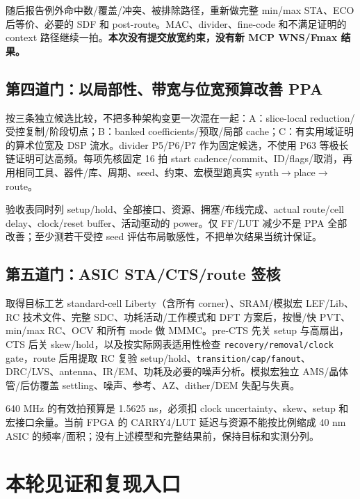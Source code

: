 \documentclass[UTF8,fontset=fandol,10pt,a4paper,openany]{ctexrep}
\newcommand{\code}[1]{\nolinkurl{#1}}
\begin{document}
随后报告例外命中数/覆盖/冲突、被排除路径，重新做完整 min/max STA、ECO 后等价、必要的 SDF 和 post-route。MAC、divider、fine-code 和不满足证明的 context 路径继续一拍。\textbf{本次没有提交放宽约束，没有新 MCP WNS/Fmax 结果。}


\subsection{第四道门：以局部性、带宽与位宽预算改善 PPA}


按三条独立候选比较，不把多种架构变更一次混在一起：A：slice-local reduction/受控复制/阶段切点；B：banked coefficients/预取/局部 cache；C：有实用域证明的算术位宽及 DSP 流水。divider P5/P6/P7 作为固定候选，不使用 P63 等极长链证明可达高频。每项先核固定 16 拍 start cadence/commit、ID/flags/取消，再用相同工具、器件/库、周期、seed、约束、宏模型跑真实 synth\ensuremath{\rightarrow}place\ensuremath{\rightarrow}route。


验收表同时列 setup/hold、全部接口、资源、拥塞/布线完成、actual route/cell delay、clock/reset buffer、活动驱动的 power。仅 FF/LUT 减少不是 PPA 全部改善；至少测若干受控 seed 评估布局敏感性，不把单次结果当统计保证。


\subsection{第五道门：ASIC STA/CTS/route 签核}


取得目标工艺 standard-cell Liberty（含所有 corner）、SRAM/模拟宏 LEF/Lib、RC 技术文件、完整 SDC、功耗活动/工作模式和 DFT 方案后，按慢/快 PVT、min/max RC、OCV 和所有 mode 做 MMMC。pre-CTS 先关 setup 与高扇出，CTS 后关 skew/hold，以及按实际网表适用性检查 \code{recovery/removal/clock} gate，route 后用提取 RC 复验 setup/hold、\code{transition/cap/fanout}、DRC/LVS、antenna、IR/EM、功耗及必要的噪声分析。模拟宏独立 AMS/晶体管/后仿覆盖 settling、噪声、参考、AZ、dither/DEM 失配与失真。


640 MHz 的有效拍预算是 1.5625 ns，必须扣 clock uncertainty、skew、setup 和宏接口余量。当前 FPGA 的 CARRY4/LUT 延迟与资源不能按比例缩成 40 nm ASIC 的频率/面积；没有上述模型和完整结果前，保持目标和实测分列。


\section{本轮见证和复现入口}
\end{document}

